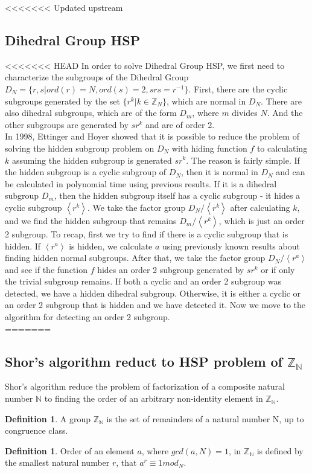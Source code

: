 \documentclass[12pt]{article}
\theoremstyle{plain}
\theoremstyle{definition}
\newtheorem{defn}[thm]{Definition} %
\begin{document}
<<<<<<< Updated upstream
\subsection{Dihedral Group HSP}
<<<<<<< HEAD
In order to solve Dihedral Group HSP, we first need to characterize the subgroups of the Dihedral Group $D_N=\lbrace r,s| ord(r)=N,ord(s)=2,srs=r^{-1}\rbrace$. First, there are the cyclic subgroups generated by the set $\lbrace r^k|k\in\mathbb{Z}_N\rbrace$, which are normal in $D_N$. There are also dihedral subgroups, which are of the form $D_m$, where $m$ divides $N$. And the other subgroups are generated by $sr^k$ and are of order 2. \\
In 1998, Ettinger and Hoyer	showed that it is possible to reduce the problem of solving the hidden subgroup problem on $D_N$ with hiding function $f$ to calculating $k$ assuming the hidden subgroup is generated $sr^k$. The reason is fairly simple. If the hidden subgroup is a cyclic subgroup of $D_N$, then it is normal in $D_N$ and can be calculated in polynomial time using previous results. If it is a dihedral subgroup $D_m$, then the hidden subgroup itself has a cyclic subgroup - it hides a cyclic subgroup $\left<r^k\right>$. We take the factor group $D_N/\left<r^k\right>$ after calculating $k$, and we find the hidden subgroup that remains $D_m/\left<r^k\right>$, which is just an order 2 subgroup. To recap, first we try to find if there is a cyclic subgroup that is hidden. If $\left<r^a\right>$ is hidden, we calculate $a$ using previously known results about finding hidden normal subgroups. After that, we take the factor group $D_N/\left<r^a\right>$ and see if the function $f$ hides an order 2 subgroup generated by $sr^k$ or if only the trivial subgroup remains. If both a cyclic and an order 2 subgroup was detected, we have a hidden dihedral subgroup. Otherwise, it is either a cyclic or an order 2 subgroup that is hidden and we have detected it. Now we move to the algorithm for detecting an order 2 subgroup.\\
=======
\subsection{Shor's algorithm reduct to HSP problem of $\mathbb{Z_{N}}$}
	Shor's algorithm reduce the problem of  factorization of a composite natural number $\mathbb{N}$ to finding the order of an arbitrary non-identity element in $\mathbb{Z_{N}}$.  
\begin{defn}
	A group $\mathbb{Z_{N}}$ is the set of remainders of a natural number N, up to congruence class.
\end{defn}
\begin{defn}
	
	Order of an element $a$, where $gcd(a, N)=1$, in $\mathbb{Z_{N}}$ is defined by the smallest natural number $r$, that $a^{r}\equiv 1mod_{N}$.
\end{defn}
	
\end{document}
